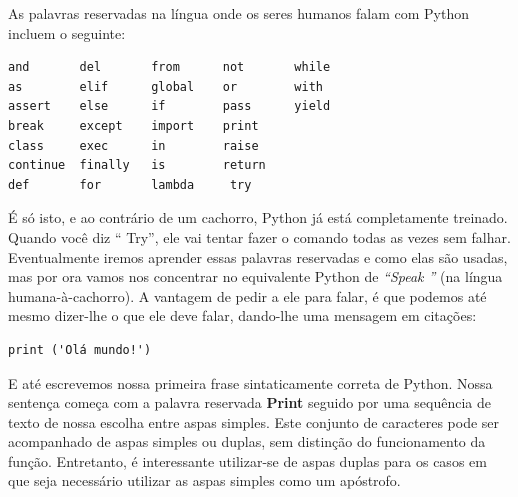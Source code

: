 As palavras reservadas na língua onde os seres humanos falam com Python incluem o seguinte:


\begin{verbatim}
and       del       from      not       while    
as        elif      global    or        with     
assert    else      if        pass      yield    
break     except    import    print              
class     exec      in        raise              
continue  finally   is        return             
def       for       lambda     try
\end{verbatim}

%
É só isto, e ao contrário de um cachorro, Python já está completamente treinado.
Quando você diz `` Try'', ele vai tentar fazer o comando todas as vezes sem falhar.
Eventualmente iremos aprender essas palavras reservadas e como elas são usadas, mas por ora vamos nos concentrar no equivalente Python de \textit{``Speak ''} (na língua humana-à-cachorro).  A vantagem de pedir a ele para falar,
é que podemos até mesmo dizer-lhe o que ele deve falar, dando-lhe uma mensagem em citações:


\begin{verbatim}
print ('Olá mundo!')
\end{verbatim}


E até escrevemos nossa primeira frase sintaticamente correta de Python.
Nossa sentença começa com a palavra reservada {\bf Print} seguido
por uma sequência de texto de nossa escolha entre aspas simples. Este conjunto de caracteres pode ser acompanhado de aspas simples ou duplas, sem distinção do funcionamento da função. Entretanto, é interessante utilizar-se de aspas duplas para os casos em que seja necessário utilizar as aspas simples como um apóstrofo.

